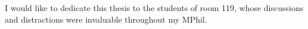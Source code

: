
\begin{dedication} 

I would like to dedicate this thesis to the students of room 119, whose discussions and distractions were invaluable throughout my MPhil.

\end{dedication}